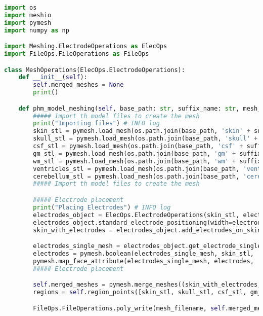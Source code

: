 \begin{lstlisting}[language=Python,caption={Class handling all mesh operations for the models},captionpos=b,label=lst:mesh_operations_class]
import os
import meshio
import pymesh
import numpy as np

import Meshing.ElectrodeOperations as ElecOps
import FileOps.FileOperations as FileOps

class MeshOperations(ElecOps.ElectrodeOperations):
    def __init__(self):
        self.merged_meshes = None
        print()

    def phm_model_meshing(self, base_path: str, suffix_name: str, mesh_filename: str, electrode_attributes: dict):
        ##### Import th model files to create the mesh
        print("Importing files") # INFO log
        skin_stl = pymesh.load_mesh(os.path.join(base_path, 'skin' + suffix_name))
        skull_stl = pymesh.load_mesh(os.path.join(base_path, 'skull' + suffix_name))
        csf_stl = pymesh.load_mesh(os.path.join(base_path, 'csf' + suffix_name))
        gm_stl = pymesh.load_mesh(os.path.join(base_path, 'gm' + suffix_name))
        wm_stl = pymesh.load_mesh(os.path.join(base_path, 'wm' + suffix_name))
        ventricles_stl = pymesh.load_mesh(os.path.join(base_path, 'ventricles' + suffix_name))
        cerebellum_stl = pymesh.load_mesh(os.path.join(base_path, 'cerebellum' + suffix_name))
        ##### Import th model files to create the mesh

        ##### Electrode placement
        print("Placing Electrodes") # INFO log
        electrodes_object = ElecOps.ElectrodeOperations(skin_stl, electrode_attributes)
        electrodes_object.standard_electrode_positioning(width=electrode_attributes['width'], radius=electrode_attributes['radius'], elements=electrode_attributes['elements'])
        skin_with_electrodes = electrodes_object.add_electrodes_on_skin()[0]

        electrodes_single_mesh = electrodes_object.get_electrode_single_mesh()
        electrodes = pymesh.boolean(electrodes_single_mesh, skin_stl, 'difference')
        pymesh.map_face_attribute(electrodes_single_mesh, electrodes, 'face_sources')
        ##### Electrode placement

        self.merged_meshes = pymesh.merge_meshes((skin_with_electrodes, skull_stl, csf_stl, gm_stl, wm_stl, cerebellum_stl, ventricles_stl))
        regions = self.region_points([skin_stl, skull_stl, csf_stl, gm_stl, wm_stl, cerebellum_stl, ventricles_stl], electrodes, 0.1)

        FileOps.FileOperations.poly_write(mesh_filename, self.merged_meshes.vertices, self.merged_meshes.faces, self.merged_meshes.get_attribute('face_sources'), regions)


\end{lstlisting}
